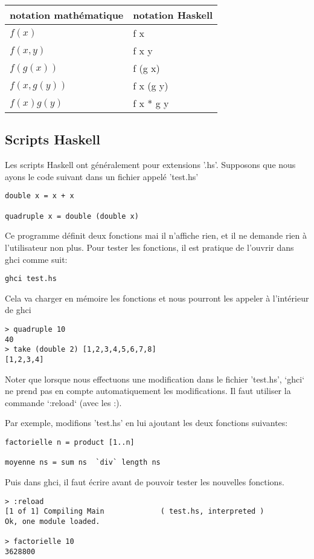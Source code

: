 \documentclass[11pt]{article}
\begin{document}
\begin{center}
\begin{tabular}{ll}
notation mathématique & notation Haskell\\
\hline
\(f(x)\) & f x\\
\(f(x,y)\) & f x y\\
\(f(g(x))\) & f (g x)\\
\(f(x,g(y))\) & f x (g y)\\
\(f(x)g(y)\) & f x * g y\\
\end{tabular}
\end{center}

\subsection{Scripts Haskell}
\label{sec:org9c8daaa}
 Les scripts Haskell ont généralement pour extensions '.hs'.    
Supposons que nous ayons le code suivant dans un fichier appelé 'test.hs'
\begin{verbatim}
double x = x + x

quadruple x = double (double x)
\end{verbatim}

 Ce programme  définit deux fonctions mai il n'affiche rien, et il ne demande rien à l'utilisateur non plus.
Pour tester les fonctions, il est pratique de l'ouvrir dans ghci  comme suit:
\begin{verbatim}
ghci test.hs
\end{verbatim}
Cela va charger en mémoire les fonctions et nous pourront les appeler à l'intérieur de ghci
\begin{verbatim}
> quadruple 10
40
> take (double 2) [1,2,3,4,5,6,7,8]
[1,2,3,4]
\end{verbatim}

Noter que lorsque  nous effectuons une modification dans le fichier 'test.hs', `ghci` ne prend pas en compte automatiquement les modifications.  Il faut utiliser la commande `:reload` (avec les :).

Par exemple,  modifions 'test.hs' en lui ajoutant les deux fonctions suivantes:
\begin{verbatim}
factorielle n = product [1..n]

moyenne ns = sum ns  `div` length ns
\end{verbatim}
Puis dans ghci, il faut écrire avant de pouvoir tester les nouvelles fonctions.
\begin{verbatim}
> :reload
[1 of 1] Compiling Main             ( test.hs, interpreted )
Ok, one module loaded.

> factorielle 10
3628800
\end{verbatim}
\end{document}
